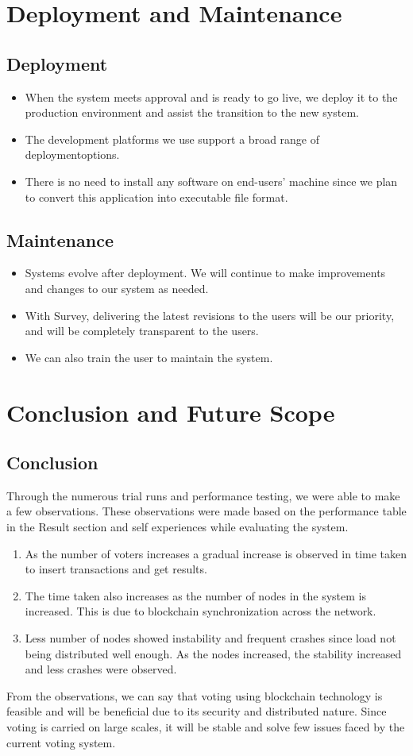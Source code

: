 \documentclass[oneside, 12pt]{book}
\begin{document}
\section{Deployment and Maintenance}
\newpage
\subsection{Deployment}
\begin{itemize}
	\item When the system meets approval and is ready to go live, we deploy it to the production environment and assist the transition to the new system.
	\item The development platforms we use support a broad range of deploymentoptions.
	\item There is no need to install any software on end-users’ machine since we plan to convert this application into executable file format.
\end{itemize}
\subsection{Maintenance}
\begin{itemize}
	\item Systems evolve after deployment. We will continue to make improvements and changes to our system as needed.
	\item With Survey, delivering the latest revisions to the users will be our priority, and will be completely transparent to the users.
	\item We can also train the user to maintain the system.
\end{itemize}
\newpage
\section{Conclusion and Future Scope}
\newpage
\subsection{Conclusion}
Through the numerous trial runs and performance testing, we were able to make a few observations. These observations were made based on the performance table in the Result section and self experiences while evaluating the system.
\begin{enumerate}
	\item As the number of voters increases a gradual increase is observed in time taken to insert transactions and get results.
	\item The time taken also increases as the number of nodes in the system is increased. This is due to blockchain synchronization across the network.
	\item Less number of nodes showed instability and frequent crashes since load not being distributed well enough. As the nodes increased, the stability increased and less crashes were observed.
\end{enumerate}
From the observations, we can say that voting using blockchain technology is feasible and will be beneficial due to its security and distributed nature. Since voting is carried on large scales, it will be stable and solve few issues faced by the current voting system.
\end{document}

